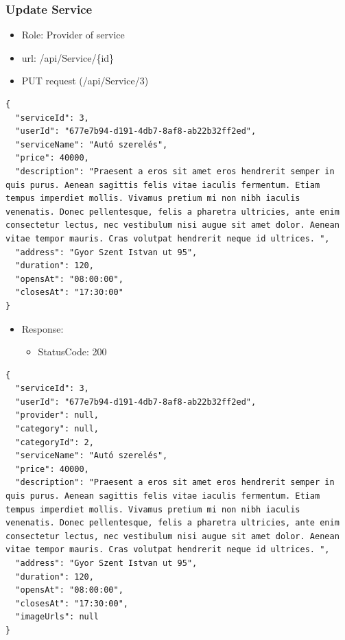 \documentclass[11pt]{article}
\begin{document}
\subsubsection{Update Service}
\label{sec:org20a5726}
\begin{itemize}
\item Role: Provider of service
\item url: /api/Service/\{id\}
\item PUT request (/api/Service/3)
\end{itemize}
\begin{verbatim}
{
  "serviceId": 3,
  "userId": "677e7b94-d191-4db7-8af8-ab22b32ff2ed",
  "serviceName": "Autó szerelés",
  "price": 40000,
  "description": "Praesent a eros sit amet eros hendrerit semper in quis purus. Aenean sagittis felis vitae iaculis fermentum. Etiam tempus imperdiet mollis. Vivamus pretium mi non nibh iaculis venenatis. Donec pellentesque, felis a pharetra ultricies, ante enim consectetur lectus, nec vestibulum nisi augue sit amet dolor. Aenean vitae tempor mauris. Cras volutpat hendrerit neque id ultrices. ",
  "address": "Gyor Szent Istvan ut 95",
  "duration": 120,
  "opensAt": "08:00:00",
  "closesAt": "17:30:00"
}
\end{verbatim}
\begin{itemize}
\item Response:
\begin{itemize}
\item StatusCode: 200
\end{itemize}
\end{itemize}
\begin{verbatim}
{
  "serviceId": 3,
  "userId": "677e7b94-d191-4db7-8af8-ab22b32ff2ed",
  "provider": null,
  "category": null,
  "categoryId": 2,
  "serviceName": "Autó szerelés",
  "price": 40000,
  "description": "Praesent a eros sit amet eros hendrerit semper in quis purus. Aenean sagittis felis vitae iaculis fermentum. Etiam tempus imperdiet mollis. Vivamus pretium mi non nibh iaculis venenatis. Donec pellentesque, felis a pharetra ultricies, ante enim consectetur lectus, nec vestibulum nisi augue sit amet dolor. Aenean vitae tempor mauris. Cras volutpat hendrerit neque id ultrices. ",
  "address": "Gyor Szent Istvan ut 95",
  "duration": 120,
  "opensAt": "08:00:00",
  "closesAt": "17:30:00",
  "imageUrls": null
}
\end{verbatim}
\end{document}
